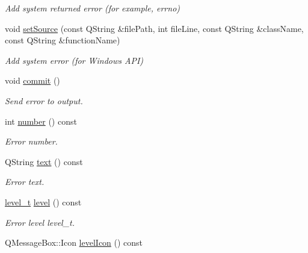 \begin{DoxyCompactItemize}
\begin{DoxyCompactList}\small\item\em Add system returned error (for example, errno) \end{DoxyCompactList}\item 
void \hyperlink{classmdt_error_a8dd3203e11b308e6c2701d7f075af885}{setSource} (const QString \&filePath, int fileLine, const QString \&className, const QString \&functionName)
\begin{DoxyCompactList}\small\item\em Add system error (for Windows API) \end{DoxyCompactList}\item 
\hypertarget{classmdt_error_ad3cccf7c7f7d4bdabdcb4e60794bb9cb}{
void \hyperlink{classmdt_error_ad3cccf7c7f7d4bdabdcb4e60794bb9cb}{commit} ()}
\label{classmdt_error_ad3cccf7c7f7d4bdabdcb4e60794bb9cb}

\begin{DoxyCompactList}\small\item\em Send error to output. \end{DoxyCompactList}\item 
int \hyperlink{classmdt_error_ad233adb8efe4180b85f584c5afdd49fc}{number} () const 
\begin{DoxyCompactList}\small\item\em Error number. \end{DoxyCompactList}\item 
\hypertarget{classmdt_error_a8630bb6b21b70edfe3d13eaff82a1baf}{
QString \hyperlink{classmdt_error_a8630bb6b21b70edfe3d13eaff82a1baf}{text} () const }
\label{classmdt_error_a8630bb6b21b70edfe3d13eaff82a1baf}

\begin{DoxyCompactList}\small\item\em Error text. \end{DoxyCompactList}\item 
\hypertarget{classmdt_error_a8d8382d3008de890689df415deb7766e}{
\hyperlink{classmdt_error_a5c8b1a040e2feaa848f6201d6b6f0cd7}{level\_\-t} \hyperlink{classmdt_error_a8d8382d3008de890689df415deb7766e}{level} () const }
\label{classmdt_error_a8d8382d3008de890689df415deb7766e}

\begin{DoxyCompactList}\small\item\em Error level  level\_\-t. \end{DoxyCompactList}\item 
\hypertarget{classmdt_error_aac5a7cec9a5d4364f9331c80e1eafe99}{
QMessageBox::Icon \hyperlink{classmdt_error_aac5a7cec9a5d4364f9331c80e1eafe99}{levelIcon} () const }
\label{classmdt_error_aac5a7cec9a5d4364f9331c80e1eafe99}


\end{DoxyCompactItemize}
